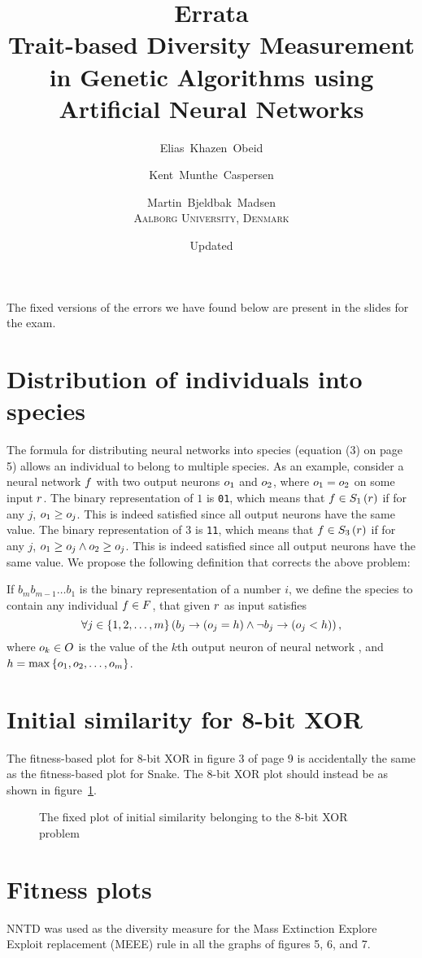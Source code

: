 \documentclass{memoir}
\title{Errata\\
\Large Trait-based Diversity Measurement in Genetic Algorithms using Artificial Neural Networks}
\author{Elias~Khazen~Obeid \and
        Kent~Munthe~Caspersen \and
        Martin~Bjeldbak~Madsen\\
    \scshape Aalborg University, Denmark}
\date{Updated \formatdate{22}{6}{2014}}
\begin{document}
\pagestyle{empty}
\maketitle
\thispagestyle{empty}


The fixed versions of the errors we have found below are present in the slides for the exam.

\section*{Distribution of individuals into species}
The formula for distributing neural networks into species (equation (3) on page 5) allows an individual to belong to multiple species.
As an example, consider a neural network $f$ with two output neurons $o_1$ and $o_2$, where $o_1 = o_2$ on some input $r$.
The binary representation of $1$ is \texttt{01}, which means that $f \in S_{1}\left(r\right)$ if for any $j$, $o_1 \geq o_j$. This is indeed satisfied since all output neurons have the same value.
The binary representation of $3$ is \texttt{11}, which means that $f \in S_{3}\left(r\right)$ if for any $j$, $o_1 \geq o_j \wedge o_2 \geq o_j$. This is indeed satisfied since all output neurons have the same value. We propose the following definition that corrects the above problem:

If $b_{m}b_{m-1}\dots b_1$ is the binary representation of a number $i$, we define the species  to contain any individual $f \in F$, that given $r$ as input satisfies
\begin{equation*}
  \forall j \in \left\{1, 2,\dots,m\right\}\left(b_j \rightarrow \left(o_j = h\right) \land \neg b_j \rightarrow \left(o_j < h\right)\right),
\end{equation*}
where $o_k \in O$ is the value of the $k$th output neuron of neural network \ind, and $h = \max\left\{o_1, o_2, \dots, o_m\right\}$.

\section*{Initial similarity for 8-bit XOR}
The fitness-based plot for 8-bit XOR in figure 3 of page 9 is accidentally the same as the fitness-based plot for Snake. 
The 8-bit XOR plot should instead be as shown in figure~\ref{fig:initial-similarity-xor}.

\begin{figure}[htbp]
  \centering
  \resizebox{0.5\linewidth}{!}{%
  
}
  \caption{The fixed plot of initial similarity belonging to the 8-bit XOR problem}\label{fig:initial-similarity-xor}
\end{figure}

\section*{Fitness plots}
NNTD was used as the diversity measure for the Mass Extinction Explore Exploit replacement (MEEE) rule in all the graphs of figures 5, 6, and 7.
\end{document}
